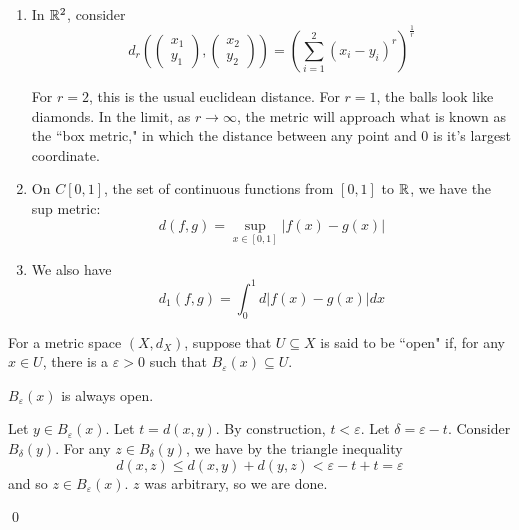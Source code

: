 \documentclass[x11names,reqno,14pt]{extarticle}
\begin{document}
\begin{enumerate}
\item In $\mathbb{R}^2$, consider 
\[
d_r\left(\begin{pmatrix} x_1 \\ y_1 \end{pmatrix}, \begin{pmatrix} x_2 \\ y_2 \end{pmatrix} \right) = \left(\sum_{i=1}^2 (x_i - y_i)^r\right)^{\frac{1}{r}}
\]

For $r = 2$, this is the usual euclidean distance. For $r = 1$, the balls look like diamonds. In the limit, as $r\to \infty$, the metric will approach what is known as the ``box metric," in which the distance between any point and 0 is it's largest coordinate. 
\item On $C[0, 1]$, the set of continuous functions from $[0, 1]$ to $\mathbb{R}$, we have the sup metric: 
\[
d(f, g) = \sup_{x\in[0, 1]}|f(x) - g(x)|
\]

\item We also have
\[
d_1(f, g) = \int_0^1d|f(x) - g(x)|dx
\]



\end{enumerate}


For a metric space $(X, d_X)$, suppose that $U \subseteq X$ is said to be ``open" if, for any $x \in U$, there is a $\varepsilon>0$ such that $B_\varepsilon(x) \subseteq U$. 

\lem 

$B_\varepsilon(x)$ is always open. 

\proof

Let $y \in B_\varepsilon(x)$. Let $t = d(x, y)$. By construction, $t <\varepsilon$. Let $\delta = \varepsilon - t$. Consider $B_\delta(y)$. For any $z \in B_\delta(y)$, we have by the triangle inequality
\[
d(x, z) \leq d(x, y) + d(y, z) < \varepsilon - t + t = \varepsilon
\]
and so $z \in B_\varepsilon(x)$. $z$ was arbitrary, so we are done.

\qed
\end{document}

